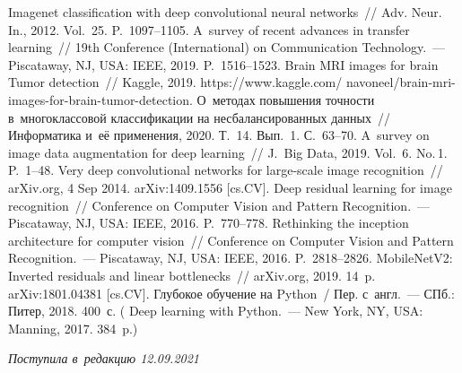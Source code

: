 \begin{multicols}{2}
{{\begin{thebibliography}{99}
{}
 Imagenet classification with deep convolutional 
neural networks~// Adv. Neur. In., 2012. Vol.~25.  
P.~1097--1105.
 A~survey of recent advances in transfer learning~// 19th  
Conference (International) on Communication Technology.~--- Piscataway, NJ, USA: IEEE, 2019. 
P.~1516--1523.
 Brain MRI images for brain Tumor detection~// Kaggle, 2019. {\sf 
https://www.kaggle.com/ navoneel/brain-mri-images-for-brain-tumor-detection}.
 О~методах повышения точности 
в~многоклассовой классификации на несбалансированных данных~// Информатика и~её 
применения, 2020. Т.~14. Вып.~1. С.~63--70. 
 A~survey on image data augmentation for deep learning~// 
J.~Big Data, 2019. Vol.~6. No.\,1. P.~1--48.
 Very deep convolutional networks for large-scale image 
recognition~// arXiv.org, 4 Sep 2014. arXiv:1409.1556 [cs.CV].
 Deep residual learning for image recognition~//
Conference on Computer Vision and Pattern Recognition.~--- Piscataway, NJ, USA: IEEE, 2016.  
P.~770--778.
 Rethinking the inception 
architecture for computer vision~// Conference on Computer Vision and Pattern 
Recognition.~--- Piscataway, NJ, USA: IEEE, 2016. P.~2818--2826.
 MobileNetV2: Inverted 
residuals and linear bottlenecks~// arXiv.org, 2019. 14~p. arXiv:1801.04381  [cs.CV].
 Глубокое обучение на Python~/ Пер. с~англ.~--- СПб.: Питер, 2018. 400~с. 
( Deep learning with Python.~--- New York, NY, USA: Manning, 2017. 384~p.) 
 \end{thebibliography}

}
}

\end{multicols}

\vspace*{-3pt}

\hfill{\small\textit{Поступила в~редакцию 12.09.2021}}

\vspace*{8pt}



